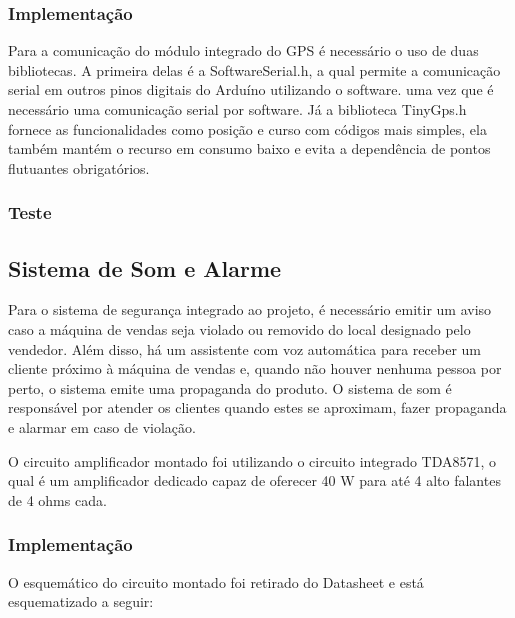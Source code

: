 \subsubsection{Implementação}

Para a comunicação do módulo integrado do GPS é necessário o uso de duas bibliotecas. A primeira delas é a SoftwareSerial.h, a qual permite a comunicação serial em outros pinos digitais do Arduíno utilizando o software.  uma vez que é necessário uma comunicação serial por software. Já a biblioteca TinyGps.h fornece as funcionalidades como posição e curso com códigos mais simples, ela também mantém o recurso em consumo baixo e evita a dependência de pontos flutuantes obrigatórios.

\subsubsection{Teste}


\subsection{Sistema de Som e Alarme}

Para o sistema de segurança integrado ao projeto, é necessário emitir um aviso caso a máquina de vendas seja violado ou removido do local designado pelo vendedor. Além disso, há um assistente com voz automática para receber um cliente próximo à máquina de vendas e, quando não houver nenhuma pessoa por perto, o sistema emite uma propaganda do produto. O sistema de som é responsável por atender os clientes quando estes se aproximam, fazer propaganda e alarmar em caso de violação.

O circuito amplificador montado foi utilizando o circuito integrado TDA8571, o qual é um amplificador dedicado capaz de oferecer 40 W para até 4 alto falantes de 4 ohms cada.

\subsubsection{Implementação}

O esquemático do circuito montado foi retirado do Datasheet \cite{mq2} e está esquematizado a seguir:

